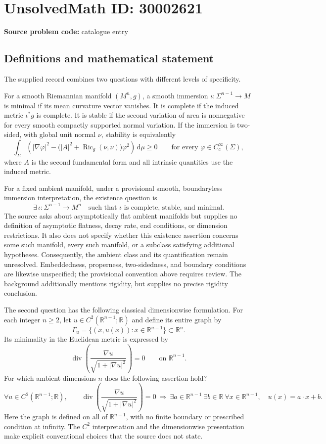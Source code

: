 \documentclass[11pt]{article}
\newcommand{\R}{\mathbb{R}}
\begin{document}
\section*{UnsolvedMath ID: 30002621}
\textbf{Source problem code:} catalogue entry
\subsection{Definitions and mathematical statement}
The supplied record combines two questions with different levels of specificity.

For a smooth Riemannian manifold $(M^n,g)$, a smooth immersion $\iota:\Sigma^{n-1}\to M$ is minimal if its mean curvature vector vanishes. It is complete if the induced metric $\iota^*g$ is complete. It is stable if the second variation of area is nonnegative for every smooth compactly supported normal variation. If the immersion is two-sided, with global unit normal $\nu$, stability is equivalently
\[
\int_\Sigma\left(|\nabla\varphi|^2-\bigl(|A|^2+\operatorname{Ric}_g(\nu,\nu)\bigr)\varphi^2\right)\,\mathrm d\mu\geq0
\qquad\text{for every }\varphi\in C_c^\infty(\Sigma),
\]
where $A$ is the second fundamental form and all intrinsic quantities use the induced metric.

For a fixed ambient manifold, under a provisional smooth, boundaryless immersion interpretation, the existence question is
\[
\exists\,\iota:\Sigma^{n-1}\to M^n\quad\text{such that }\iota\text{ is complete, stable, and minimal}.
\]
The source asks about asymptotically flat ambient manifolds but supplies no definition of asymptotic flatness, decay rate, end conditions, or dimension restrictions. It also does not specify whether this existence assertion concerns some such manifold, every such manifold, or a subclass satisfying additional hypotheses. Consequently, the ambient class and its quantification remain unresolved. Embeddedness, properness, two-sidedness, and boundary conditions are likewise unspecified; the provisional convention above requires review. The background additionally mentions rigidity, but supplies no precise rigidity conclusion.

The second question has the following classical dimensionwise formulation. For each integer $n\geq2$, let $u\in C^2(\R^{n-1};\R)$ and define its entire graph by
\[
\Gamma_u=\{(x,u(x)):x\in\R^{n-1}\}\subset\R^n.
\]
Its minimality in the Euclidean metric is expressed by
\[
\operatorname{div}\left(\frac{\nabla u}{\sqrt{1+|\nabla u|^2}}\right)=0
\qquad\text{on }\R^{n-1}.
\]
For which ambient dimensions $n$ does the following assertion hold?
\[
\forall u\in C^2(\R^{n-1};\R),\qquad
\operatorname{div}\left(\frac{\nabla u}{\sqrt{1+|\nabla u|^2}}\right)=0
\ \Longrightarrow\ 
\exists a\in\R^{n-1}\ \exists b\in\R\ \forall x\in\R^{n-1},\quad u(x)=a\cdot x+b.
\]
Here the graph is defined on all of $\R^{n-1}$, with no finite boundary or prescribed condition at infinity. The $C^2$ interpretation and the dimensionwise presentation make explicit conventional choices that the source does not state.
\end{document}
